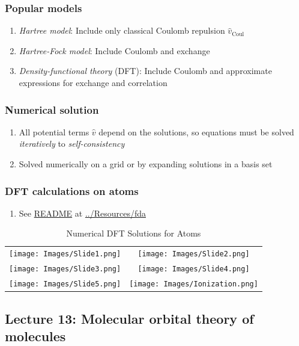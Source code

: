 \documentclass[11pt]{article}
\begin{document}
\subsubsection{Popular models}
\label{sec:orgfeecd69}
\begin{enumerate}
\item \emph{Hartree model}: Include only classical Coulomb repulsion \(\hat v_\mathrm{Coul}\)
\item \emph{Hartree-Fock model}: Include Coulomb and exchange
\item \emph{Density-functional theory} (DFT): Include Coulomb and
approximate expressions for exchange and correlation
\end{enumerate}
\subsubsection{Numerical solution}
\label{sec:org1fb1f15}
\begin{enumerate}
\item All potential terms \(\hat v\) depend on the solutions, so  equations must be solved \emph{iteratively} to \emph{self-consistency}
\item Solved numerically on a grid or by expanding solutions in a basis set
\end{enumerate}
\subsubsection{DFT calculations on atoms}
\label{sec:org15759bd}
\begin{enumerate}
\item See \href{../Resources/fda/00README.txt}{README} at \url{../Resources/fda}
\end{enumerate}

\begin{table}[]
   \caption{Numerical DFT Solutions for Atoms }
\begin{tabular}{cc}
\texttt{[image: Images/Slide1.png]} & \texttt{[image: Images/Slide2.png]} \\
\texttt{[image: Images/Slide3.png]} & \texttt{[image: Images/Slide4.png]} \\
\texttt{[image: Images/Slide5.png]} & \texttt{[image: Images/Ionization.png]} 
\end{tabular}
\end{table}

\subsection{Lecture 13: Molecular orbital theory of molecules}
\label{sec:org039adaa}
\end{document}
